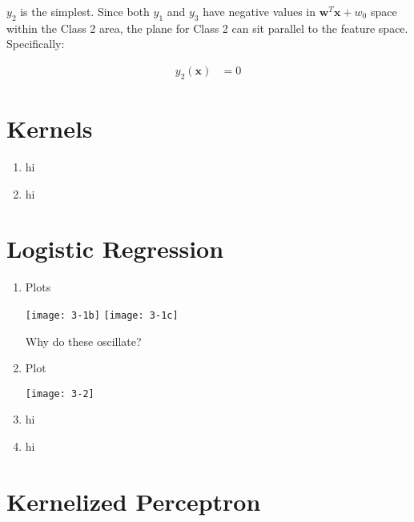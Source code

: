 \documentclass{article}
\begin{document}
$y_2$ is the simplest. Since both $y_1$ and $y_3$ have negative values
in $\mathbf{w}^T\mathbf{x} + w_0$ space within the Class 2 area,
the plane for Class 2 can sit parallel to the feature space. Specifically:

\begin{align*}
  y_2(\mathbf{x}) &= 0
\end{align*}

\section{Kernels}

\begin{enumerate}
\item hi
\item hi
\end{enumerate}

\section{Logistic Regression}

\begin{enumerate}
\item Plots
  \begin{center}
  \texttt{[image: 3-1b]}
  \texttt{[image: 3-1c]}
\end{center}

  Why do these oscillate?
  
\item Plot
  \begin{center}
    \texttt{[image: 3-2]}
  \end{center}
\item hi
\item hi
\end{enumerate}

\section{Kernelized Perceptron}
\end{document}
